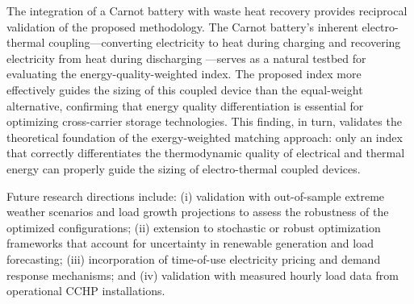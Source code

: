 The integration of a Carnot battery with waste heat recovery provides reciprocal validation of the proposed methodology. The Carnot battery's inherent electro-thermal coupling---converting electricity to heat during charging and recovering electricity from heat during discharging \cite{zhao2024cbthermo,huang2025cbdynamic}---serves as a natural testbed for evaluating the energy-quality-weighted index. The proposed index more effectively guides the sizing of this coupled device than the equal-weight alternative, confirming that energy quality differentiation is essential for optimizing cross-carrier storage technologies. This finding, in turn, validates the theoretical foundation of the exergy-weighted matching approach: only an index that correctly differentiates the thermodynamic quality of electrical and thermal energy can properly guide the sizing of electro-thermal coupled devices.

Future research directions include: (i) validation with out-of-sample extreme weather scenarios and load growth projections to assess the robustness of the optimized configurations; (ii) extension to stochastic or robust optimization frameworks that account for uncertainty in renewable generation and load forecasting; (iii) incorporation of time-of-use electricity pricing and demand response mechanisms; and (iv) validation with measured hourly load data from operational CCHP installations.
